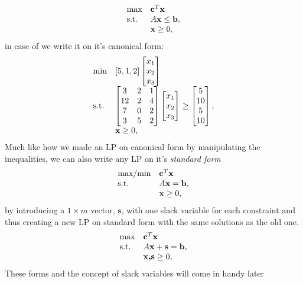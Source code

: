 \begin{align}\label{canonicalMax}
\begin{array}{ll@{}ll}
\text{max} &\textbf{c}^T\textbf{x}&\\
\text{s.t.} &A\textbf{x} \leq \textbf{b},&\\
&\textbf{x} \geq 0,&\\
\end{array}
\end{align}
in case of  we write it on it's canonical form:
\begin{align}
\begin{array}{ll@{}ll}
\text{min} &[5,1,2]\begin{bmatrix}x_{1} \\x_{2} \\x_{3}\end{bmatrix}&\\
\text{s.t.} &\begin{bmatrix}3&2&1 \\12&2&4 \\7&0&2\\3&5&2\end{bmatrix}\begin{bmatrix}x_{1} \\x_{2} \\x_{3}\end{bmatrix} \geq \begin{bmatrix}5 \\10 \\5\\10\end{bmatrix},&\\
&\textbf{x} \geq 0,&\\
\end{array}
\end{align}
Much like how we made an LP on canonical form by manipulating the inequalities, we can also write any LP on it's \textit{standard form} 
\begin{align}
\begin{array}{ll@{}ll}
\text{max/min} &\textbf{c}^T\textbf{x}&\\
\text{s.t.} &A\textbf{x} = \textbf{b},&\\
&\textbf{x} \geq 0,&\\
\end{array}
\end{align}
by introducing a $1\times m$ vector, $\textbf{s}$, with one slack variable for each constraint and thus creating a new LP on standard form with the same solutions as the old one.
\begin{align}
\begin{array}{ll@{}ll}
\text{max} &\textbf{c}^T\textbf{x}&\\
\text{s.t.} &A\textbf{x}+\textbf{s} =\textbf{b},&\\
&\textbf{x,s} \geq 0,&\\
\end{array}
\end{align}
These forms and the concept of slack variables will come in handy later
\iffalse
